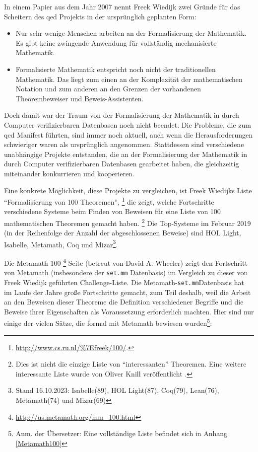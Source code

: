 In einem Papier aus dem Jahr 2007 nennt Freek Wiedijk zwei Gründe für das Scheitern des {\sc qed} Projekts in der ursprünglich geplanten Form:%
\cite{Wiedijk-revisited}

\begin{itemize}
\item Nur sehr wenige Menschen arbeiten an der Formalisierung der Mathematik. Es gibt keine zwingende Anwendung für vollständig mechanisierte Mathematik.
\item Formalisierte Mathematik entspricht noch nicht der traditionellen Mathematik. Das liegt zum einen an der Komplexität der mathematischen Notation und zum anderen an den Grenzen der vorhandenen Theorembeweiser und Beweis-Assistenten.
\end{itemize}

Doch damit war der Traum von der Formalisierung der Mathematik in durch Computer verifizierbaren Datenbasen noch nicht beendet.
Die Probleme, die zum {\sc qed} Manifest führten, sind immer noch aktuell, auch wenn die Herausforderungen schwieriger waren als ursprünglich angenommen.
Stattdessen sind verschiedene unabhängige Projekte entstanden, die an der Formalisierung der Mathematik in durch Computer verifizierbaren Datenbasen gearbeitet haben, die gleichzeitig miteinander konkurrieren und kooperieren.

Eine konkrete Möglichkeit, diese Projekte zu vergleichen, ist
Freek Wiedijks Liste "`Formalisierung von 100 Theoremen"',%
\footnote{\url{http://www.cs.ru.nl/\%7Efreek/100/}.}
die zeigt, welche Fortschritte verschiedene Systeme beim Finden von Beweisen für eine Liste von 100 mathematischen Theoremen gemacht haben.%
\footnote{ Dies ist nicht die einzige Liste von "`interessanten"' Theoremen. Eine weitere interessante Liste wurde von Oliver Knill veröffentlicht \cite{Knill}.}
Die Top-Systeme im Februar 2019 (in der Reihenfolge der Anzahl der abgeschlossenen Beweise) sind HOL Light, Isabelle, Metamath, Coq und Mizar\footnote{Stand 16.10.2023: Isabelle(89), HOL Light(87), Coq(79), Lean(76), Metamath(74) und Mizar(69)}.

Die Metamath 100%
\footnote{\url{http://us.metamath.org/mm\_100.html}} Seite (betreut von David A. Wheeler)
zeigt den Fortschritt von Metamath (insbesondere der \texttt{set.mm} Datenbasis) im Vergleich zu dieser von Freek Wiedijk geführten Challenge-Liste.
Die Metamath-\texttt{set.mm}Datenbasis hat im Laufe der Jahre große Fortschritte gemacht, zum Teil deshalb, weil die Arbeit an den Beweisen dieser Theoreme
die Definition verschiedener Begriffe und die Beweise ihrer Eigenschaften als Voraussetzung erforderlich machten.
Hier sind nur einige der vielen Sätze, die formal mit Metamath bewiesen wurden\footnote{Anm. der Übersetzer: Eine vollständige Liste befindet sich in Anhang \ref{Metamath100}}:

